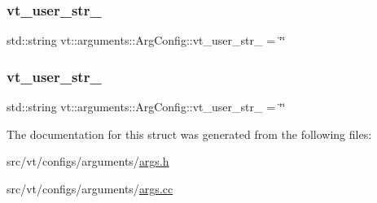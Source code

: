 \subsubsection{\texorpdfstring{vt\+\_\+user\+\_\+str\+\_}{vt\_user\_str\_2}}
{\footnotesize\ttfamily std\+::string vt\+::arguments\+::\+Arg\+Config\+::vt\+\_\+user\+\_\+str\+\_ = \char`\"{}\char`\"{}\hspace{0.3cm}{\ttfamily [static]}}

\mbox{\label{structvt_1_1arguments_1_1_arg_config_a848bd14c34337ef8d48fd740061a4923}} 
\subsubsection{\texorpdfstring{vt\+\_\+user\+\_\+str\+\_}{vt\_user\_str\_3}}
{\footnotesize\ttfamily std\+::string vt\+::arguments\+::\+Arg\+Config\+::vt\+\_\+user\+\_\+str\+\_ = \char`\"{}\char`\"{}\hspace{0.3cm}{\ttfamily [static]}}



The documentation for this struct was generated from the following files\+:\begin{DoxyCompactItemize}
\item 
src/vt/configs/arguments/\hyperlink{args_8h}{args.\+h}\item 
src/vt/configs/arguments/\hyperlink{args_8cc}{args.\+cc}\end{DoxyCompactItemize}
